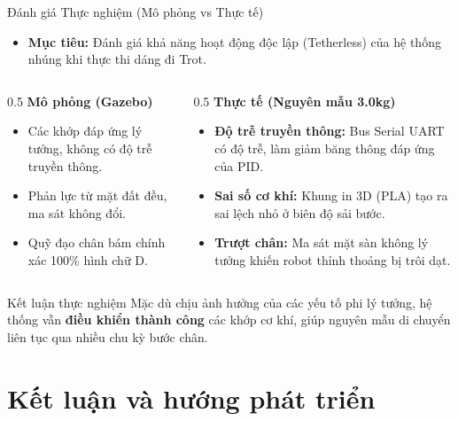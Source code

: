 \documentclass[10pt,aspectratio=169]{beamer}
\begin{document}
\begin{frame}{Đánh giá Thực nghiệm (Mô phỏng vs Thực tế)}
  \begin{itemize}
      \item \textbf{Mục tiêu:} Đánh giá khả năng hoạt động độc lập (Tetherless) của hệ thống nhúng khi thực thi dáng đi Trot.
  \end{itemize}
  \vspace{0.2cm}
  \begin{columns}
      \begin{column}{0.5\textwidth}
          \textbf{Mô phỏng (Gazebo)}
          \begin{itemize}
              \item Các khớp đáp ứng lý tưởng, không có độ trễ truyền thông.
              \item Phản lực từ mặt đất đều, ma sát không đổi.
              \item Quỹ đạo chân bám chính xác 100\% hình chữ D.
          \end{itemize}
      \end{column}
      \begin{column}{0.5\textwidth}
          \textbf{Thực tế (Nguyên mẫu 3.0kg)}
          \begin{itemize}
              \item \textbf{Độ trễ truyền thông:} Bus Serial UART có độ trễ, làm giảm băng thông đáp ứng của PID.
              \item \textbf{Sai số cơ khí:} Khung in 3D (PLA) tạo ra sai lệch nhỏ ở biên độ sải bước.
              \item \textbf{Trượt chân:} Ma sát mặt sàn không lý tưởng khiến robot thỉnh thoảng bị trôi dạt.
          \end{itemize}
      \end{column}
  \end{columns}
  \vspace{0.2cm}
  \begin{alertblock}{Kết luận thực nghiệm}
      Mặc dù chịu ảnh hưởng của các yếu tố phi lý tưởng, hệ thống vẫn \textbf{điều khiển thành công} các khớp cơ khí, giúp nguyên mẫu di chuyển liên tục qua nhiều chu kỳ bước chân.
  \end{alertblock}
\end{frame}

\section{Kết luận và hướng phát triển}
\end{document}
